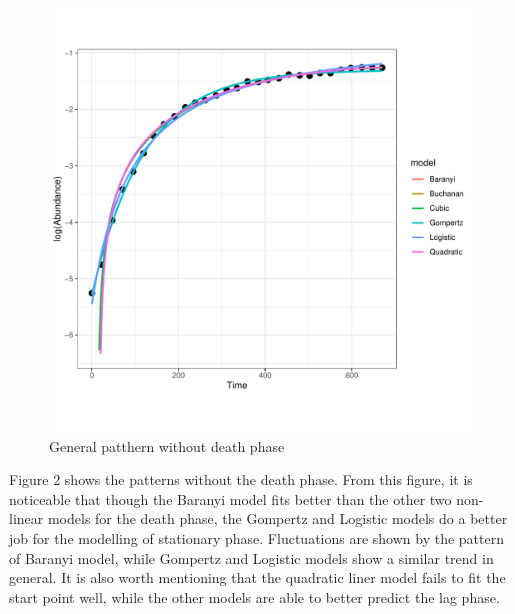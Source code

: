 \documentclass[11pt, oneside]{article}
\begin{document}
\begin{figure}[H]
\begin{center}
\begin{minipage}{.5\textwidth}
				\includegraphics[page=90, scale = 0.5]{plot_subsets.pdf}
			\end{minipage}
			\end{center}
		\caption{General patthern without death phase}
		\end{figure}
		
		\noindent Figure 2 shows the patterns without the death phase. From this figure, it is noticeable that though the Baranyi model fits better than the other two non-linear models for the death phase, the Gompertz and Logistic models do a better job for the modelling of stationary phase. Fluctuations are shown by the pattern of Baranyi model, while Gompertz and Logistic models show a similar trend in general. It is also worth mentioning that the quadratic liner model fails to fit the start point well, while the other models are able to better predict the lag phase. 		
		
\end{document}
